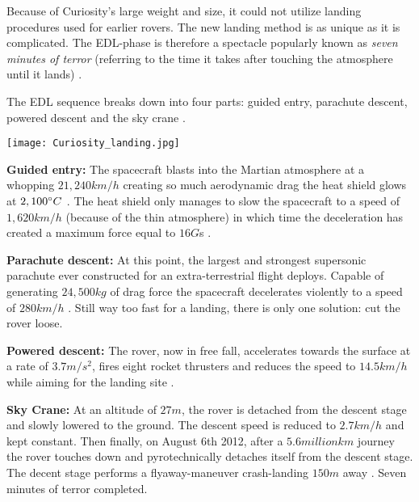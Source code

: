 \begin{tcolorbox}[colback=red!5,colframe=DarkRed!40!black,title=Entry\, Descent and Landing (EDL)]
Because of Curiosity’s large weight and size, it could not utilize landing procedures used for earlier rovers.
The new landing method is as unique as it is complicated.
The EDL-phase is therefore a spectacle popularly known as \textit{seven minutes of terror} (referring to the time it takes after touching the atmosphere until it lands) \cite{CNN_7minterror}. 

The EDL sequence breaks down into four parts: guided entry, parachute descent, powered descent and the sky crane \cite{NASALanding}. \vspace{2mm}

\begin{center}
	\texttt{[image: Curiosity\_landing.jpg]}
\end{center}

\textbf{Guided entry:}
The spacecraft blasts into the Martian atmosphere at a whopping $21,240 km/h$ creating so much aerodynamic drag the heat shield glows at $2,100 \degree C$ \cite{NASA_youtube}.
The heat shield only manages to slow the spacecraft to a speed of $1,620 km/h$ (because of the thin atmosphere) in which time the deceleration has created a maximum force equal to $16 G$s \cite{HistoricLanding} \cite{NASALanding}.

\textbf{Parachute descent:}
At this point, the largest and strongest supersonic parachute ever constructed for an extra-terrestrial flight deploys.
Capable of generating $24,500 kg$ of drag force the spacecraft decelerates violently to a speed of $280 km/h$ \cite{Parachute} \cite{NASALanding}.
Still way too fast for a landing, there is only one solution: cut the rover loose.

\textbf{Powered descent:}
The rover, now in free fall, accelerates towards the surface at a rate of $3.7 m/s^{2}$, fires eight rocket thrusters and reduces the speed to $14.5 km/h$ while aiming for the landing site \cite{HistoricLanding} \cite{NASALanding}. 

\textbf{Sky Crane:}
At an altitude of $27 m$, the rover is detached from the descent stage and slowly lowered to the ground.
The descent speed is reduced to $2.7 km/h$ and kept constant.
Then finally, on August 6th 2012, after a $5.6 million km$ \cite{CNNCuriosity} journey the rover touches down and pyrotechnically detaches itself from the descent stage.
The decent stage performs a flyaway-maneuver crash-landing $150 m$ away \cite{HistoricLanding} \cite{NASALanding}. Seven minutes of terror completed.
\end{tcolorbox}